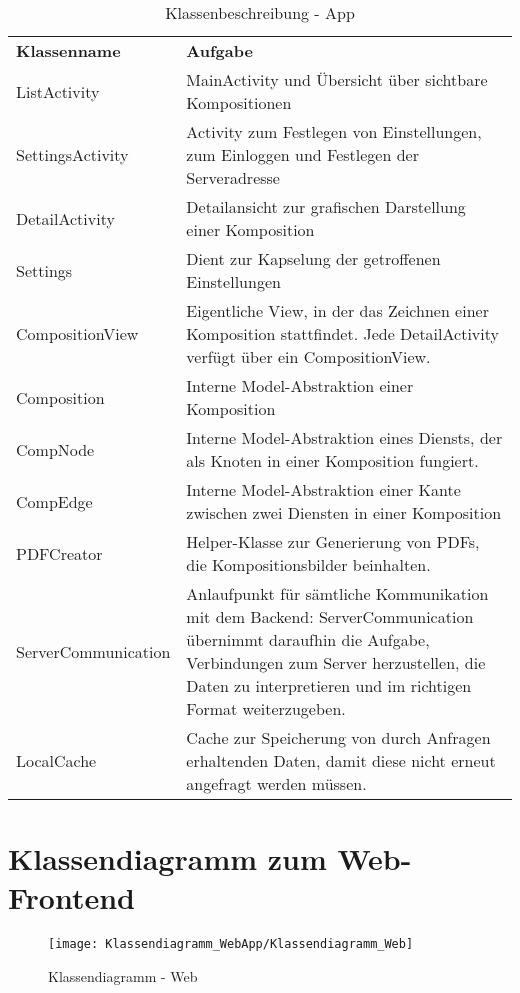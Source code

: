 \begin{table}[h]
	\centering
	\begin{tabularx}{\textwidth}{X X}
		\rowcolor[HTML]{C0C0C0} 
		\textbf{Klassenname} & \textbf{Aufgabe} \\
		ListActivity & MainActivity und Übersicht über sichtbare Kompositionen  \\
		\rowcolor[HTML]{E7E7E7} 
		SettingsActivity & Activity zum Festlegen von Einstellungen, zum Einloggen und Festlegen der Serveradresse \\
		DetailActivity & Detailansicht zur grafischen Darstellung einer Komposition \\
		\rowcolor[HTML]{E7E7E7} 
		Settings & Dient zur Kapselung der getroffenen Einstellungen \\
		CompositionView & Eigentliche View, in der das Zeichnen einer Komposition stattfindet. Jede DetailActivity verfügt über ein CompositionView. \\
		\rowcolor[HTML]{E7E7E7} 
		Composition & Interne Model-Abstraktion einer Komposition \\
		CompNode & Interne Model-Abstraktion eines Diensts, der als Knoten in einer Komposition fungiert. \\
		\rowcolor[HTML]{E7E7E7} 
		CompEdge & Interne Model-Abstraktion einer Kante zwischen zwei Diensten in einer Komposition \\
		PDFCreator & Helper-Klasse zur Generierung von PDFs, die Kompositionsbilder beinhalten. \\
			\rowcolor[HTML]{E7E7E7} 
		ServerCommunication & Anlaufpunkt für sämtliche Kommunikation mit dem Backend: ServerCommunication übernimmt daraufhin die Aufgabe, Verbindungen zum Server herzustellen, die Daten zu interpretieren und im richtigen Format weiterzugeben. \\
		LocalCache & Cache zur Speicherung von durch Anfragen erhaltenden Daten, damit diese nicht erneut angefragt werden müssen. 
	\end{tabularx}
	\caption{Klassenbeschreibung - App}
	\label{table:klassenbeschreibung-a}
\end{table}

\section*{Klassendiagramm zum Web-Frontend}

\begin{figure}[h]
	\centering
	\texttt{[image: Klassendiagramm\_WebApp/Klassendiagramm\_Web]}
	\caption{Klassendiagramm - Web}
	\label{fig:klassendiagramm-web}
\end{figure}

